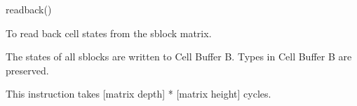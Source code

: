 

\format

readback()

\purpose

To read back cell states from the sblock matrix.

\description

The states of all sblocks are written to Cell Buffer B.
Types in Cell Buffer B are preserved.

\notes

This instruction takes [matrix depth] * [matrix height] cycles.

